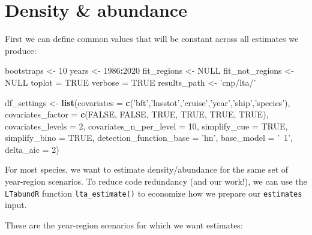 \documentclass[
]{book}
\newenvironment{Shaded}{\begin{snugshade}}{\end{snugshade}}
\newcommand{\DataTypeTok}[1]{\textcolor[rgb]{0.13,0.29,0.53}{#1}}
\newcommand{\DecValTok}[1]{\textcolor[rgb]{0.00,0.00,0.81}{#1}}
\newcommand{\KeywordTok}[1]{\textcolor[rgb]{0.13,0.29,0.53}{\textbf{#1}}}
\newcommand{\NormalTok}[1]{#1}
\newcommand{\OperatorTok}[1]{\textcolor[rgb]{0.81,0.36,0.00}{\textbf{#1}}}
\newcommand{\OtherTok}[1]{\textcolor[rgb]{0.56,0.35,0.01}{#1}}
\newcommand{\StringTok}[1]{\textcolor[rgb]{0.31,0.60,0.02}{#1}}
\begin{document}
\hypertarget{density-abundance-1}{%
\section*{Density \& abundance}\label{density-abundance-1}}

First we can define common values that will be constant across all estimates we produce:

\begin{Shaded}
\begin{Highlighting}[]
\NormalTok{bootstraps <-}\StringTok{ }\DecValTok{10}
\NormalTok{years <-}\StringTok{ }\DecValTok{1986}\OperatorTok{:}\DecValTok{2020}
\NormalTok{fit_regions <-}\StringTok{ }\OtherTok{NULL}
\NormalTok{fit_not_regions <-}\StringTok{ }\OtherTok{NULL}
\NormalTok{toplot =}\StringTok{ }\OtherTok{TRUE}
\NormalTok{verbose =}\StringTok{ }\OtherTok{TRUE}
\NormalTok{results_path <-}\StringTok{ 'cnp/lta/'}

\NormalTok{df_settings <-}
\StringTok{  }\KeywordTok{list}\NormalTok{(}\DataTypeTok{covariates =} \KeywordTok{c}\NormalTok{(}\StringTok{'bft'}\NormalTok{,}\StringTok{'lnsstot'}\NormalTok{,}\StringTok{'cruise'}\NormalTok{,}\StringTok{'year'}\NormalTok{,}\StringTok{'ship'}\NormalTok{,}\StringTok{'species'}\NormalTok{),}
       \DataTypeTok{covariates_factor =} \KeywordTok{c}\NormalTok{(}\OtherTok{FALSE}\NormalTok{, }\OtherTok{FALSE}\NormalTok{, }\OtherTok{TRUE}\NormalTok{, }\OtherTok{TRUE}\NormalTok{, }\OtherTok{TRUE}\NormalTok{, }\OtherTok{TRUE}\NormalTok{),}
       \DataTypeTok{covariates_levels =} \DecValTok{2}\NormalTok{,}
       \DataTypeTok{covariates_n_per_level =} \DecValTok{10}\NormalTok{,}
       \DataTypeTok{simplify_cue =} \OtherTok{TRUE}\NormalTok{,}
       \DataTypeTok{simplify_bino =} \OtherTok{TRUE}\NormalTok{,}
       \DataTypeTok{detection_function_base =} \StringTok{'hn'}\NormalTok{,}
       \DataTypeTok{base_model =} \StringTok{'~1'}\NormalTok{,}
       \DataTypeTok{delta_aic =} \DecValTok{2}\NormalTok{)}
\end{Highlighting}
\end{Shaded}

For most species, we want to estimate density/abundance for the same set of year-region scenarios. To reduce code redundancy (and our work!), we can use the \texttt{LTabundR} function \texttt{lta\_estimate()} to economize how we prepare our \texttt{estimates} input.

These are the year-region scenarios for which we want estimates:
\end{document}
